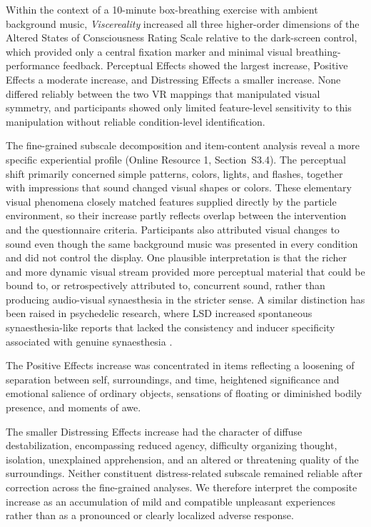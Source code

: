 \documentclass[pdflatex,sn-basic,lineno]{sn-jnl}
\begin{document}
Within the context of a 10-minute box-breathing exercise with ambient background music, \textit{Viscereality} increased all three higher-order dimensions of the Altered States of Consciousness Rating Scale relative to the dark-screen control, which provided only a central fixation marker and minimal visual breathing-performance feedback. Perceptual Effects showed the largest increase, Positive Effects a moderate increase, and Distressing Effects a smaller increase. None differed reliably between the two VR mappings that manipulated visual symmetry, and participants showed only limited feature-level sensitivity to this manipulation without reliable condition-level identification.

The fine-grained subscale decomposition and item-content analysis reveal a more specific experiential profile (Online Resource 1, Section~S3.4). The perceptual shift primarily concerned simple patterns, colors, lights, and flashes, together with impressions that sound changed visual shapes or colors. These elementary visual phenomena closely matched features supplied directly by the particle environment, so their increase partly reflects overlap between the intervention and the questionnaire criteria. Participants also attributed visual changes to sound even though the same background music was presented in every condition and did not control the display. One plausible interpretation is that the richer and more dynamic visual stream provided more perceptual material that could be bound to, or retrospectively attributed to, concurrent sound, rather than producing audio-visual synaesthesia in the stricter sense. A similar distinction has been raised in psychedelic research, where LSD increased spontaneous synaesthesia-like reports that lacked the consistency and inducer specificity associated with genuine synaesthesia \citep{Terhune2016LSD}.

The Positive Effects increase was concentrated in items reflecting a loosening of separation between self, surroundings, and time, heightened significance and emotional salience of ordinary objects, sensations of floating or diminished bodily presence, and moments of awe.

The smaller Distressing Effects increase had the character of diffuse destabilization, encompassing reduced agency, difficulty organizing thought, isolation, unexplained apprehension, and an altered or threatening quality of the surroundings. Neither constituent distress-related subscale remained reliable after correction across the fine-grained analyses. We therefore interpret the composite increase as an accumulation of mild and compatible unpleasant experiences rather than as a pronounced or clearly localized adverse response.
\end{document}
